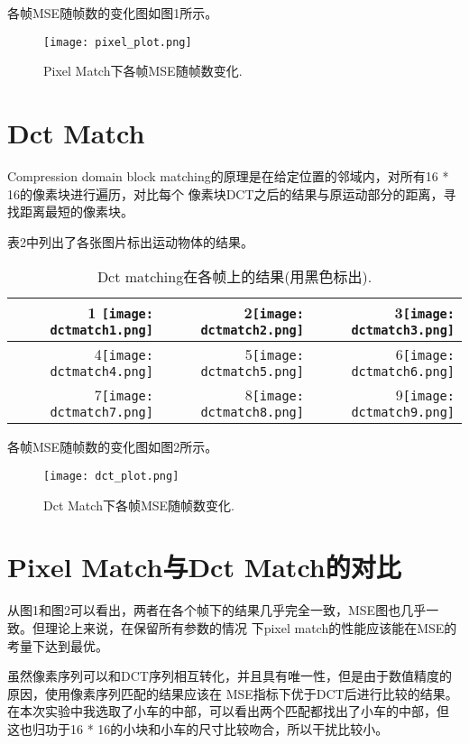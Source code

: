 \documentclass{ctexart}
\begin{document}
各帧MSE随帧数的变化图如图1所示。
\begin{figure}
\centering
\texttt{[image: pixel\_plot.png]}
\caption{Pixel Match下各帧MSE随帧数变化.}
\end{figure}

\section{Dct Match}
Compression domain block matching的原理是在给定位置的邻域内，对所有16 * 16的像素块进行遍历，对比每个
像素块DCT之后的结果与原运动部分的距离，寻找距离最短的像素块。

表2中列出了各张图片标出运动物体的结果。

\begin{table}
\Large 
\begin{tabular}{|r|r|r|}
\hline

1 \texttt{[image: dctmatch1.png]} & 2\texttt{[image: dctmatch2.png]} & 3\texttt{[image: dctmatch3.png]} \\ \hline

4\texttt{[image: dctmatch4.png]} & 5\texttt{[image: dctmatch5.png]} & 6\texttt{[image: dctmatch6.png]} \\ \hline

7\texttt{[image: dctmatch7.png]} & 8\texttt{[image: dctmatch8.png]} & 9\texttt{[image: dctmatch9.png]} \\ \hline

\end{tabular}
\caption{Dct matching在各帧上的结果(用黑色标出).}
\end{table}

各帧MSE随帧数的变化图如图2所示。
\begin{figure}
\centering
\texttt{[image: dct\_plot.png]}
\caption{Dct Match下各帧MSE随帧数变化.}
\end{figure}

\section{Pixel Match与Dct Match的对比}
从图1和图2可以看出，两者在各个帧下的结果几乎完全一致，MSE图也几乎一致。但理论上来说，在保留所有参数的情况
下pixel match的性能应该能在MSE的考量下达到最优。

虽然像素序列可以和DCT序列相互转化，并且具有唯一性，但是由于数值精度的原因，使用像素序列匹配的结果应该在
MSE指标下优于DCT后进行比较的结果。在本次实验中我选取了小车的中部，可以看出两个匹配都找出了小车的中部，但
这也归功于16 * 16的小块和小车的尺寸比较吻合，所以干扰比较小。
\end{document}
